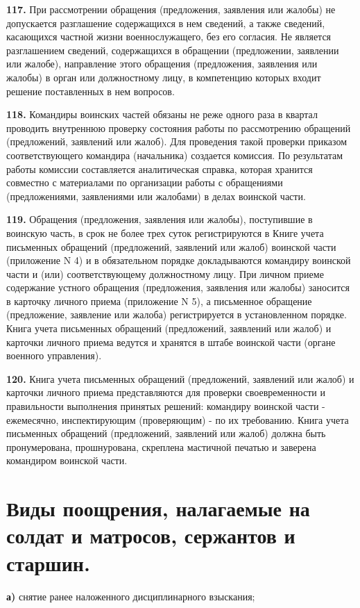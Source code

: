 \documentclass[12pt,a4paper]{report}
\begin{document}
\textbf{117.} При рассмотрении обращения (предложения, заявления или жалобы) не допускается разглашение содержащихся в нем сведений, а также сведений, касающихся частной жизни военнослужащего, без его согласия. Не является разглашением сведений, содержащихся в обращении (предложении, заявлении или жалобе), направление этого обращения (предложения, заявления или жалобы) в орган или должностному лицу, в компетенцию которых входит решение поставленных в нем вопросов.



\textbf{118.} Командиры воинских частей обязаны не реже одного раза в квартал проводить внутреннюю проверку состояния работы по рассмотрению обращений (предложений, заявлений или жалоб). Для проведения такой проверки приказом соответствующего командира (начальника) создается комиссия. По результатам работы комиссии составляется аналитическая справка, которая хранится совместно с материалами по организации работы с обращениями (предложениями, заявлениями или жалобами) в делах воинской части.



\textbf{119.} Обращения (предложения, заявления или жалобы), поступившие в воинскую часть, в срок не более трех суток регистрируются в Книге учета письменных обращений (предложений, заявлений или жалоб) воинской части (приложение N 4) и в обязательном порядке докладываются командиру воинской части и (или) соответствующему должностному лицу.
При личном приеме содержание устного обращения (предложения, заявления или жалобы) заносится в карточку личного приема (приложение N 5), а письменное обращение (предложение, заявление или жалоба) регистрируется в установленном порядке.
Книга учета письменных обращений (предложений, заявлений или жалоб) и карточки личного приема ведутся и хранятся в штабе воинской части (органе военного управления).



\textbf{120.} Книга учета письменных обращений (предложений, заявлений или жалоб) и карточки личного приема представляются для проверки своевременности и правильности выполнения принятых решений: командиру воинской части - ежемесячно, инспектирующим (проверяющим) - по их требованию.
Книга учета письменных обращений (предложений, заявлений или жалоб) должна быть пронумерована, прошнурована, скреплена мастичной печатью и заверена командиром воинской части.

\section{Виды поощрения, налагаемые на солдат и матросов, сержантов и старшин.}
\textbf{а)} снятие  ранее  наложенного  дисциплинарного  взыскания;
\end{document}
